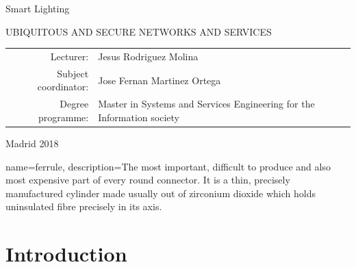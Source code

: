 \documentclass[UKenglish,10pt,a4paper]{report}
\let\openright=\clearpage
\begin{document}
\begin{titlepage}
\begin{center}
\vspace{10mm}

{\LARGE\bfseries } Smart Lighting

\vfill

UBIQUITOUS AND SECURE NETWORKS AND SERVICES

\vfill

\begin{tabular}{rl}

Lecturer: & Jesus Rodriguez Molina  \\
\noalign{\vspace{2mm}}
Subject coordinator: & Jose Fernan Martinez Ortega \\
\noalign{\vspace{2mm}}
Degree programme: & Master in Systems and Services Engineering for the Information society \\
\end{tabular}

\vfill

Madrid 2018

\end{center}
\end{titlepage}
\newpage



\openright

\noindent






\openright
\pagestyle{plain}
\setcounter{page}{1}
\tableofcontents



{
	name=ferrule,
	description={The most important, difficult to produce and also most expensive part of every round connector. It is a thin, precisely manufactured cylinder made usually out of zirconium dioxide which holds uninsulated fibre precisely in its axis. 
	}
}
\chapter{Introduction}



\renewcommand{\acronymname}{List of acronyms}

\printglossaries



% 
\printbibliography
\openright
\end{document}
